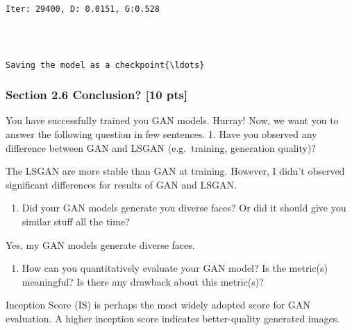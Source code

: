 \documentclass[11pt]{article}
\providecommand{\tightlist}{%
      \setlength{\itemsep}{0pt}\setlength{\parskip}{0pt}}
\begin{document}
    \begin{Verbatim}[commandchars=\\\{\}]

Iter: 29400, D: 0.0151, G:0.528
    \end{Verbatim}

    \begin{center}
    \end{center}
    { \hspace*{\fill} \\}
    
    \begin{Verbatim}[commandchars=\\\{\}]

Saving the model as a checkpoint{\ldots}
    \end{Verbatim}

    \hypertarget{section-2.6-conclusion-10-pts}{%
\subsubsection{Section 2.6 Conclusion? {[}10
pts{]}}\label{section-2.6-conclusion-10-pts}}

You have successfully trained you GAN models. Hurray! Now, we want you
to answer the following question in few sentences. 1. Have you observed
any difference between GAN and LSGAN (e.g.~training, generation
quality)?

The LSGAN are more stable than GAN at training. However, I didn't
observed significant differences for results of GAN and LSGAN.

\begin{enumerate}
\def\labelenumi{\arabic{enumi}.}
\setcounter{enumi}{1}
\tightlist
\item
  Did your GAN models generate you diverse faces? Or did it should give
  you similar stuff all the time?
\end{enumerate}

Yes, my GAN models generate diverse faces.

\begin{enumerate}
\def\labelenumi{\arabic{enumi}.}
\setcounter{enumi}{2}
\tightlist
\item
  How can you quantitatively evaluate your GAN model? Is the metric(s)
  meaningful? Is there any drawback about this metric(s)?
\end{enumerate}

Inception Score (IS) is perhaps the most widely adopted score for GAN
evaluation. A higher inception score indicates better-quality generated
images.
\end{document}
